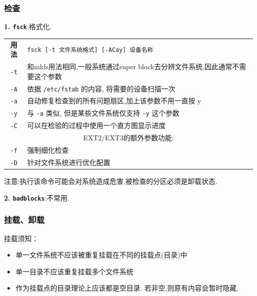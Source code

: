 \subsubsection{检查}
\textbf{1. \texttt{fsck}}:格式化.
{\kaishu
\begin{longtable}{c@{: }p{}}\hline\hline

    \textbf{用法} & \verb"fsck [-t 文件系统格式] [-ACay] 设备名称"
    \\
    \texttt{-t} & 和mkfs用法相同,一般系统通过super block去分辨文件系统,因此通常不需要这个参数 \\

    \texttt{-A}  & 依据 \texttt{/etc/fstab} 的内容, 将需要的设备扫描一次  \\

    \texttt{-a} & 自动修复检查到的所有问题扇区,加上该参数不用一直按 y \\

    \texttt{-y} & 与 \texttt{-a} 类似, 但是某些文件系统仅支持 \texttt{-y} 这个参数 \\

    \texttt{-C} & 可以在检验的过程中使用一个直方图显示进度 \\

    \multicolumn{2}{p{\columnwidth}}{EXT2/EXT3的额外参数功能:} \\

    \texttt{-f} & 强制细化检查 \\

    \texttt{-D} & 针对文件系统进行优化配置 \\

    \hline
\end{longtable}}
注意:执行该命令可能会对系统造成危害,被检查的分区必须是卸载状态.

\textbf{2. \texttt{badblocks}}:不常用.

\subsubsection{挂载、卸载}
挂载须知：
\begin{itemize}
    \item 单一文件系统不应该被重复挂载在不同的挂载点(目录)中

    \item 单一目录不应该重复挂载多个文件系统

    \item 作为挂载点的目录理论上应该都是空目录. 若非空,则原有内容会暂时隐藏.
\end{itemize}

